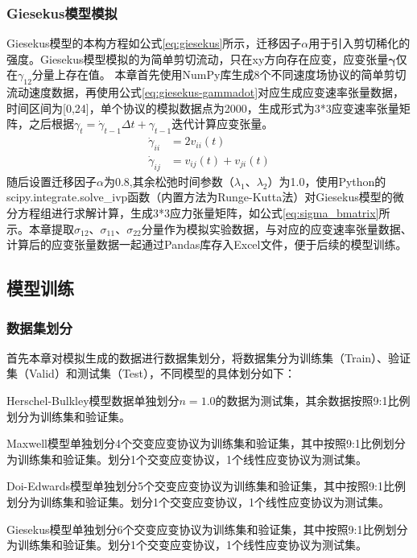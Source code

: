 \subsubsection{Giesekus模型模拟}
Giesekus模型的本构方程如公式\eqref{eq:giesekus}所示，迁移因子$\alpha$用于引入剪切稀化的强度。Giesekus模型模拟的为简单剪切流动，只在xy方向存在应变，应变张量$\boldsymbol{\gamma}$仅在$\gamma_{12}$分量上存在值。
本章首先使用NumPy库生成8个不同速度场协议的简单剪切流动速度数据，再使用公式\eqref{eq:giesekus-gammadot}对应生成应变速率张量数据，时间区间为[0,24]，单个协议的模拟数据点为2000，生成形式为3*3应变速率张量矩阵，之后根据$\gamma_{t}=\dot{\gamma}_{t-1}\Delta t+\gamma_{t-1}$迭代计算应变张量。
\begin{equation}
  \begin{aligned}
    \dot{\gamma}_{ii} & = 2 v_{ii}(t)           \\
    \dot{\gamma}_{ij} & = v_{ij}(t) + v_{ji}(t)
  \end{aligned} \label{eq:giesekus-gammadot}
\end{equation}
随后设置迁移因子$\alpha$为0.8,其余松弛时间参数（$\lambda_1$、$\lambda_2$）为1.0，使用Python的scipy.integrate.solve\_ivp函数（内置方法为Runge-Kutta法）对Giesekus模型的微分方程组进行求解计算，生成3*3应力张量矩阵，如公式\eqref{eq:sigma_bmatrix}所示。本章提取$\sigma_{12}$、$\sigma_{11}$、$\sigma_{22}$分量作为模拟实验数据，与对应的应变速率张量数据、计算后的应变张量数据一起通过Pandas库存入Excel文件，便于后续的模型训练。

\subsection{模型训练}
\subsubsection{数据集划分}
首先本章对模拟生成的数据进行数据集划分，将数据集分为训练集（Train）、验证集（Valid）和测试集（Test），不同模型的具体划分如下：

Herschel-Bulkley模型数据单独划分$n=1.0$的数据为测试集，其余数据按照9:1比例划分为训练集和验证集。

Maxwell模型单独划分4个交变应变协议为训练集和验证集，其中按照9:1比例划分为训练集和验证集。划分1个交变应变协议，1个线性应变协议为测试集。

Doi-Edwards模型单独划分5个交变应变协议为训练集和验证集，其中按照9:1比例划分为训练集和验证集。划分1个交变应变协议，1个线性应变协议为测试集。

Giesekus模型单独划分6个交变应变协议为训练集和验证集，其中按照9:1比例划分为训练集和验证集。划分1个交变应变协议，1个线性应变协议为测试集。
